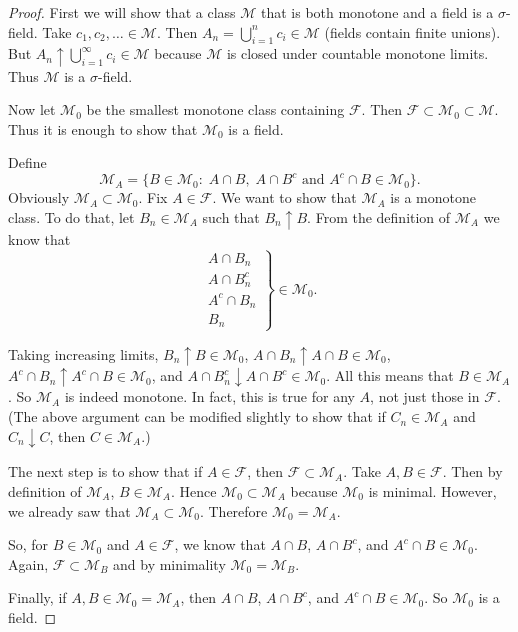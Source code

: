 \documentclass[11pt,fleqn]{book} %
\begin{document}
\begin{proof}
	First we will show that a class $\mathcal{M}$ that is both monotone and a field is a $\sigma$-field. Take $c_1,c_2,\dots \in \mathcal{M}$. Then $A_n = \bigcup_{i=1}^n c_i \in \mathcal{M}$ (fields contain finite unions). But $A_n \uparrow \bigcup_{i=1}^\infty c_i \in \mathcal{M}$ because $\mathcal{M}$ is closed under countable monotone limits. Thus $\mathcal{M}$ is a $\sigma$-field.

	Now let $\mathcal{M}_0$ be the smallest monotone class containing $\mathcal{F}$. Then $\mathcal{F} \subset \mathcal{M}_0 \subset \mathcal{M}$. Thus it is enough to show that $\mathcal{M}_0$ is a field.

	Define
	\[
		\mathcal{M}_A = \{B \in \mathcal{M}_0:\; A \cap B,\; A \cap B^c \textrm{ and } A^c \cap B \in \mathcal{M}_0\}.
	\]
	Obviously $\mathcal{M}_A \subset \mathcal{M}_0$. Fix $A \in \mathcal{F}$. We want to show that $\mathcal{M}_A$ is a monotone class. To do that, let $B_n \in \mathcal{M}_A$ such that $B_n \uparrow B$. From the definition of $\mathcal{M}_A$ we know that
	\[
		\left.
		\begin{array}{r}
			A \cap B_n \\
			A \cap B_n^c \\
			A^c \cap B_n \\
			B_n
		\end{array}
		\right\} \in \mathcal{M}_0.
	\]

	Taking increasing limits, $B_n \uparrow B \in \mathcal{M}_0$, $A \cap B_n \uparrow A \cap B \in \mathcal{M}_0$, $A^c \cap B_n \uparrow A^c \cap B \in \mathcal{M}_0$, and $A \cap B_n^c \downarrow A \cap B^c \in \mathcal{M}_0$. All this means that $B \in \mathcal{M}_A$. So $\mathcal{M}_A$ is indeed monotone. In fact, this is true for any $A$, not just those in $\mathcal{F}$. (The above argument can be modified slightly to show that if $C_n \in \mathcal{M}_A$ and $C_n \downarrow C$, then $C \in \mathcal{M}_A$.)

	The next step is to show that if $A \in \mathcal{F}$, then $\mathcal{F} \subset \mathcal{M}_A$. Take $A,B \in \mathcal{F}$. Then by definition of $\mathcal{M}_A$, $B \in \mathcal{M}_A$. Hence $\mathcal{M}_0 \subset \mathcal{M}_A$ because $\mathcal{M}_0$ is minimal. However, we already saw that $\mathcal{M}_A \subset \mathcal{M}_0$. Therefore $\mathcal{M}_0 = \mathcal{M}_A$.

	So, for $B \in \mathcal{M}_0$ and $A \in \mathcal{F}$, we know that $A \cap B$, $A \cap B^c$, and $A^c \cap B \in \mathcal{M}_0$. Again, $\mathcal{F} \subset \mathcal{M}_B$ and by minimality $\mathcal{M}_0 = \mathcal{M}_B$.

	Finally, if $A,B \in \mathcal{M}_0 = \mathcal{M}_A$, then $A \cap B$, $A \cap B^c$, and $A^c \cap B \in \mathcal{M}_0$. So $\mathcal{M}_0$ is a field.
\end{proof}
\end{document}
